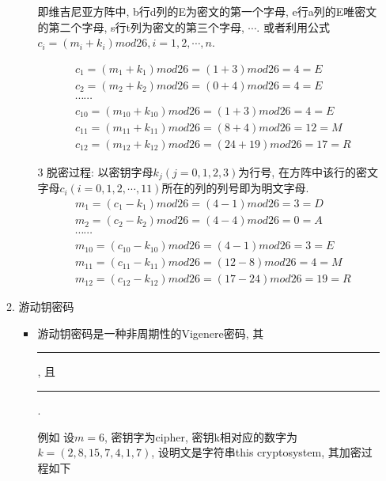 \documentclass[UTF8]{ctexart}
\newcommand\hl{\bgroup\markoverwith
  {\textcolor{yellow}{\rule[-.5ex]{2pt}{2.5ex}}}\ULon}
\begin{document}
\begin{itemize}
\begin{enumerate}
\begin{itemize}
                即维吉尼亚方阵中, b行d列的E为密文的第一个字母, e行a列的E唯密文的第二个字母, s行t列为密文的第三个字母, $\cdots$.
                或者利用公式$c_i=(m_i+k_i)mod 26, i=1, 2, \cdots, n$.

                $$
                \begin{aligned}
                    &c_1 = (m_1+k_1) mod 26 = (1+3) mod 26 = 4 = E\\
                    &c_2 = (m_2+k_2) mod 26 = (0+4) mod 26 = 4 = E\\
                    &\cdots \cdots\\
                    &c_{10} = (m_{10}+k_{10}) mod 26 = (1+3) mod 26 = 4 = E\\
                    &c_{11} = (m_{11}+k_{11}) mod 26 = (8+4) mod 26 = 12 = M\\
                    &c_{12} = (m_{12}+k_{12}) mod 26 = (24+19) mod 26 = 17 = R
                \end{aligned}
                $$

                \item [3] 脱密过程: 以密钥字母$k_j(j=0,1,2,3)$为行号, 在方阵中该行的密文字母$c_i(i=0,1,2, \cdots,11)$所在的列的列号即为明文字母.
                $$
                \begin{aligned}
                    &m_1 = (c_1-k_1) mod 26 = (4-1) mod 26 = 3 = D\\
                    &m_2 = (c_2-k_2) mod 26 = (4-4) mod 26 = 0 = A\\
                    &\cdots \cdots\\
                    &m_{10} = (c_{10}-k_{10}) mod 26 = (4-1) mod 26 = 3 = E\\
                    &m_{11} = (c_{11}-k_{11}) mod 26 = (12-8) mod 26 = 4 = M\\
                    &m_{12} = (c_{12}-k_{12}) mod 26 = (17-24) mod 26 = 19 = R
                \end{aligned}
                $$

            \end{itemize}

            \item 游动钥密码
            \begin{itemize}
                \item 游动钥密码是一种非周期性的Vigenere密码, 其\hl{密钥和明文信息一样长}, 且\hl{不重复}.

                例如 设$m=6$, 密钥字为cipher, 密钥k相对应的数字为$k=(2,8,15,7,4,1,7)$, 设明文是字符串this cryptosystem, 其加密过程如下


\end{itemize}
\end{enumerate}
\end{itemize}
\end{document}
